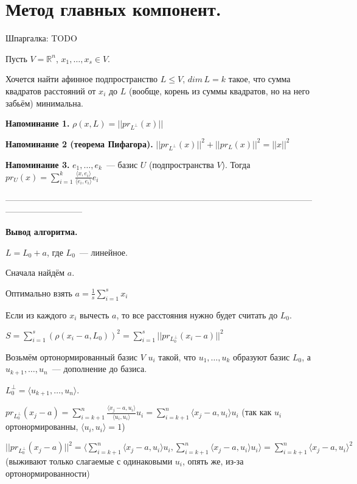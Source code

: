 \section{
Метод главных компонент.
}

Шпаргалка: TODO

Пусть $V = \mathbb{R}^n$, $x_1,\ldots, x_s \in V$.

Хочется найти афинное подпространство $L\le V$, $dim\,L = k$ такое, что сумма квадратов расстояний от $x_i$ до $L$ (вообще, корень из суммы квадратов, но на него забьём) минимальна.

{\bf Напоминание 1.} $\rho(x, L) = ||pr_{L^{\perp}}(x)||$

{\bf Напоминание 2 (теорема Пифагора).} $||pr_{L^{\perp}}(x)||^2 + ||pr_L(x)||^2 = ||x||^2$

{\bf Напоминание 3.} $e_1,\ldots,e_k$~--- базис $U$ (подпространства $V$). Тогда $pr_U(x)=\sum\limits_{i=1}^k\frac{\langle x, e_i\rangle}{\langle e_i, e_i\rangle}e_i$

---------------------------------------------------------------------------------------------------------------------------------------

{\bf Вывод алгоритма.}

$L = L_0 + a$, где $L_0$~--- линейное. 

Сначала найдём $a$.

\thrm Оптимально взять $a=\frac{1}{s}\sum\limits_{i=1}^s x_i$

\proof

Если из каждого $x_i$ вычесть $a$, то все расстояния нужно будет считать до $L_0$.

$S = \sum\limits_{i = 1}^s (\rho(x_i-a, L_0))^2 = \sum\limits_{i = 1}^s ||pr_{L_0^{\perp}}(x_i-a)||^2$

Возьмём ортонормированный базис $V$ $u_i$ такой, что $u_1,\ldots, u_k$ образуют базис $L_0$, а $u_{k+1},\ldots,u_n$~--- дополнение до базиса.

$L_0^\perp = \langle u_{k+1},\ldots,u_n\rangle$. 

$pr_{L_0^{\perp}}(x_j-a) = \sum\limits_{i = k + 1}^n \frac{\langle x_j - a, u_i\rangle}{\langle u_i, u_i\rangle}u_i = \sum\limits_{i = k + 1}^n \langle x_j - a, u_i\rangle u_i$ (так как $u_i$ ортонормированны, $\langle u_i, u_i\rangle = 1$)

$||pr_{L_0^{\perp}}(x_j-a)||^2 = \langle\sum\limits_{i = k + 1}^n \langle x_j - a, u_i\rangle u_i, \sum\limits_{i = k + 1}^n \langle x_j - a, u_i\rangle u_i\rangle = \sum\limits_{i = k + 1}^n \langle x_j - a, u_i\rangle^2$ (выживают только слагаемые с одинаковыми $u_i$, опять же, из-за ортонормированности)

